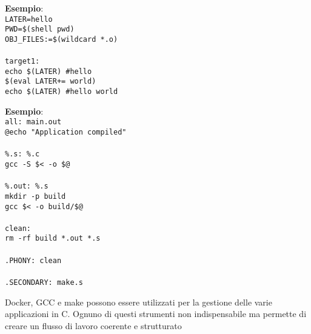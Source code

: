 \begin{flushleft}
\begin{flushleft}
\begin{flushleft}
\begin{itemize}
      \end{itemize}
      \textbf{Esempio}: \\
      \texttt{LATER=hello\\
        PWD=\$(shell pwd)\\
        OBJ\_FILES:=\$(wildcard *.o)\\
        \tab \\
        target1:\\
        \tab echo \$(LATER) \#hello\\
        \tab \$(eval LATER+= world)\\
        \tab echo \$(LATER) \#hello world
      }
    \end{flushleft}
  \end{flushleft}
  \begin{flushleft}
    \textbf{Esempio}: \\
    \texttt{all: main.out\\
              \tab @echo "Application compiled"\\
            \tab \\
            \%.s: \%.c\\
              \tab gcc -S \$< -o \$@\\
            \tab \\
            \%.out: \%.s\\
              \tab mkdir -p build \\
              \tab gcc \$< -o build/\$@\\
            \tab \\
            clean: \\
              \tab rm -rf build *.out *.s \\
            \tab \\
            .PHONY: clean\\
            \tab \\
            .SECONDARY: make.s\\
    }
  \end{flushleft}
  Docker, GCC e make possono essere utilizzati per la gestione delle varie applicazioni 
  in C. Ognuno di questi strumenti non \ace indispensabile ma permette di creare un 
  flusso di lavoro coerente e strutturato
\end{flushleft}